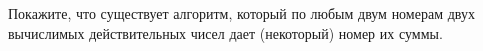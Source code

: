Покажите, что существует алгоритм, который по любым двум номерам двух вычислимых действительных чисел дает (некоторый) номер
их суммы.